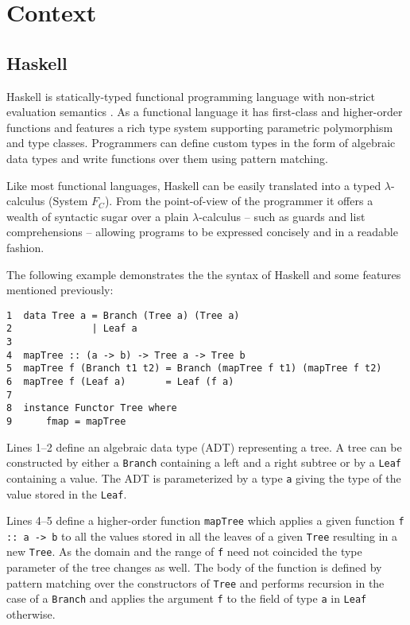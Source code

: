 \documentclass[a4paper]{report}
\begin{document}
\chapter{Context}\label{seccontext}


\section{Haskell}

Haskell is statically-typed functional programming language with non-strict evaluation semantics \cite{Haskell98}. As a functional language it has first-class and higher-order functions and features a rich type system supporting parametric polymorphism and type classes. Programmers can define custom types in the form of algebraic data types and write functions over them using pattern matching.

Like most functional languages, Haskell can be easily translated into a typed $\lambda$-calculus (System $F_C$). From the point-of-view of the programmer it offers a wealth of syntactic sugar over a plain $\lambda$-calculus -- such as guards and list comprehensions -- allowing programs to be expressed concisely and in a readable fashion.

The following example demonstrates the the syntax of Haskell and some features mentioned previously:

\begin{verbatim}
1  data Tree a = Branch (Tree a) (Tree a)
2              | Leaf a
3  
4  mapTree :: (a -> b) -> Tree a -> Tree b
5  mapTree f (Branch t1 t2) = Branch (mapTree f t1) (mapTree f t2)
6  mapTree f (Leaf a)       = Leaf (f a)
7
8  instance Functor Tree where
9      fmap = mapTree
\end{verbatim}
Lines 1--2 define an algebraic data type (ADT) representing a tree. A tree can be constructed by either a {\tt Branch} containing a left and a right subtree or by a {\tt Leaf} containing a value. The ADT is parameterized by a type {\tt a} giving the type of the value stored in the {\tt Leaf}.

Lines 4--5 define a higher-order function {\tt mapTree} which applies a given function {\tt f :: a -> b} to all the values stored in all the leaves of a given {\tt Tree} resulting in a new {\tt Tree}. As the domain and the range of {\tt f} need not coincided the type parameter of the tree changes as well. The body of the function is defined by pattern matching over the constructors of {\tt Tree} and performs recursion in the case of a {\tt Branch} and applies the argument {\tt f} to the field of type {\tt a} in {\tt Leaf} otherwise.
\end{document}
